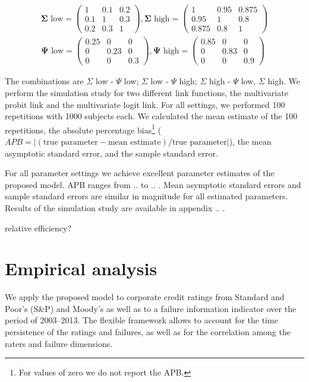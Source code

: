 \documentclass{article}
\begin{document}
\begin{align*}
  \bm \Sigma \text{ low} =
  \begin{pmatrix}
    1 & 0.1 & 0.2\\
    0.1 & 1 & 0.3\\
    0.2 & 0.3 & 1
  \end{pmatrix},
   \bm \Sigma \text{ high} =
  \begin{pmatrix}
    1 & 0.95 & 0.875\\
    0.95 & 1 & 0.8\\
    0.875 & 0.8 & 1
  \end{pmatrix}\\
     \bm \Psi \text{ low} =
    \begin{pmatrix}
    0.25 & 0 & 0\\
    0 & 0.23 & 0\\
    0 & 0 & 0.3
  \end{pmatrix},
   \bm \Psi \text{ high} =
  \begin{pmatrix}
    0.85 & 0 & 0\\
    0 & 0.83 & 0\\
    0 & 0 & 0.9
  \end{pmatrix}
\end{align*}

The combinations are $\Sigma$ low - $\Psi$ low; $\Sigma$ low - $\Psi$ high; $\Sigma$ high - $\Psi$ low, $\Sigma$ high. We perform the simulation study for two different link functions, the multivariate probit link and the multivariate logit link. For all settings, we performed 100 repetitions with 1000 subjects each. We calculated the mean estimate of the 100 repetitions, the absolute percentage bias\footnote{For values of zero we do not report the APB.} ($APB = |(\text{true parameter} - \text{mean estimate})/\text{true parameter}|$), the mean asymptotic standard error, and the sample standard error.

For all parameter settings we achieve excellent parameter estimates of the proposed model.
APB ranges from .. to .. . Mean asymptotic standard errors and sample standard errors are similar in magnitude for all estimated parameters.
Results of the simulation study are available in appendix .. .


relative efficiency?




\section{Empirical analysis}
We apply the proposed model to corporate credit ratings from Standard and Poor's (S\&P) and Moody's as well as to a failure information indicator over the period of 2003--2013. The flexible framework allows to account for the time persistence of the ratings and failures, as well as for the correlation among the raters and failure dimensions.
\end{document}
